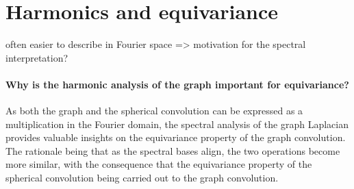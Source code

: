 \documentclass{article} %
\newcommand{\1}{\b{1}}              %
\newcommand{\0}{\b{0}}              %
\newcommand{\todo}[1]{{\color[rgb]{.6,.1,.6}{#1}}}
\begin{document}






\section{Harmonics and equivariance}

often easier to describe in Fourier space \citep{kondor2018equivariance} => motivation for the spectral interpretation?


\paragraph{Why is the harmonic analysis of the graph important for equivariance?}
As both the graph and the spherical convolution can be expressed as a multiplication in the Fourier domain, the spectral analysis of the graph Laplacian provides valuable insights on the equivariance property of the graph convolution.
The rationale being that as the spectral bases align, the two operations become more similar, with the consequence that the equivariance property of the spherical convolution being carried out to the graph convolution.
\end{document}
